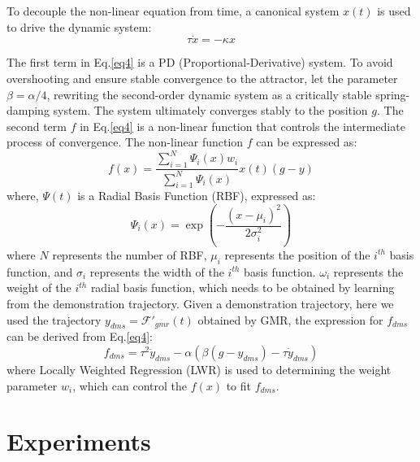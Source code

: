 \documentclass[journal]{IEEEtran}
\begin{document}
To decouple the non-linear equation from time, a canonical system $x(t)$ is used to drive the dynamic system:
\begin{equation}
    \tau \dot x = - \kappa x
\end{equation}

The first term in Eq.\ref{eq4} is a PD (Proportional-Derivative) system. To avoid overshooting and ensure stable convergence to the attractor, let the parameter $\beta = \alpha / 4$, rewriting the second-order dynamic system as a critically stable spring-damping system. The system ultimately converges stably to the position $g$. The second term $f$ in Eq.\ref{eq4} is a non-linear function that controls the intermediate process of convergence. The non-linear function $f$ can be expressed as:
\begin{equation}
    f(x)=\frac{\sum\limits_{i=1}^{N} \Psi_{i}(x) w_{i}}{\sum\limits_{i=1}^{N} \Psi_{i}(x)}x(t)(g-y)
    \label{eq5}
\end{equation}
where, $\Psi(t)$ is a Radial Basis Function (RBF), expressed as:
\begin{equation}
    \Psi_i(x)= \exp \left(-\frac{\left(x-\mu_i \right)^{2}}{2 \sigma_i^{2}}\right)
\end{equation}
where $N$ represents the number of RBF, $\mu_i$ represents the position of the $i^{th}$ basis function, and $\sigma_i$ represents the width of the $i^{th}$ basis function. $\omega_i$ represents the weight of the $i^{th}$ radial basis function, which needs to be obtained by learning from the demonstration trajectory. Given a demonstration trajectory, here we used the trajectory $y_{dms}=\mathcal{F}' _{gmr}(t)$ obtained by GMR, the expression for $f_{dms}$ can be derived from Eq.\ref{eq4}:
\begin{equation}
    f_{dms} = \tau^2 \ddot y_{dms} - \alpha(\beta (g-y_{dms})-\tau \dot y_{dms})
    \label{eq6}
\end{equation}
where Locally Weighted Regression (LWR) is used to determining the weight parameter $w_{i}$, which can control the $f(x)$ to fit $f_{dms}$.

\section{Experiments}
\end{document}
